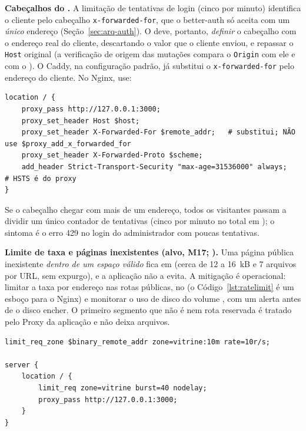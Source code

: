 \textbf{Cabeçalhos do .} A limitação de tentativas de login (cinco por minuto) identifica o cliente pelo cabeçalho \texttt{x-forwarded-for}, que o better-auth só aceita com um \emph{único} endereço (Seção~\ref{sec:arq-auth}). O  deve, portanto, \emph{definir} o cabeçalho com o endereço real do cliente, descartando o valor que o cliente enviou, e repassar o \texttt{Host} original (a verificação de origem das mutações compara o \texttt{Origin} com ele e com o ). O Caddy, na configuração padrão, já substitui o \texttt{x-forwarded-for} pelo endereço do cliente. No Nginx, use:

\begin{lstlisting}[caption={Esboço: cabeçalhos no Nginx}, label={lst:nginx}]
location / {
    proxy_pass http://127.0.0.1:3000;
    proxy_set_header Host $host;
    proxy_set_header X-Forwarded-For $remote_addr;   # substitui; NÃO use $proxy_add_x_forwarded_for
    proxy_set_header X-Forwarded-Proto $scheme;
    add_header Strict-Transport-Security "max-age=31536000" always;   # HSTS é do proxy
}
\end{lstlisting}

Se o cabeçalho chegar com mais de um endereço, todos os visitantes passam a dividir um único contador de tentativas (cinco por minuto no total em ); o sintoma é o erro 429 no login do administrador com poucas tentativas.

\textbf{Limite de taxa e páginas inexistentes (alvo, M17; ).} Uma página pública inexistente \emph{dentro de um espaço válido} fica em  (cerca de 12 a 16~kB e 7 arquivos por URL, sem expurgo), e a aplicação não a evita. A mitigação é operacional: limitar a taxa por endereço nas rotas públicas, no  (o Código~\ref{lst:ratelimit} é um esboço para o Nginx) e monitorar o uso de disco do volume , com um alerta antes de o disco encher. O primeiro segmento que não é  nem rota reservada é tratado pelo Proxy da aplicação e não deixa arquivos.

\begin{lstlisting}[caption={Esboço: limite de taxa por endereço no Nginx (ajustar os valores ao tráfego)}, label={lst:ratelimit}]
limit_req_zone $binary_remote_addr zone=vitrine:10m rate=10r/s;

server {
    location / {
        limit_req zone=vitrine burst=40 nodelay;
        proxy_pass http://127.0.0.1:3000;
    }
}
\end{lstlisting}

